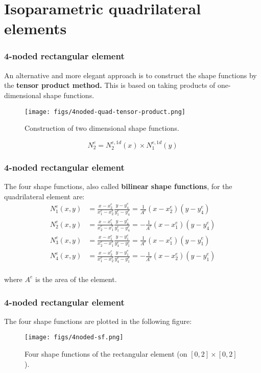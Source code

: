 \documentclass[notes]{beamer}
\begin{document}
\section{Isoparametric quadrilateral elements}

\begin{frame}
	\frametitle{4-noded rectangular element}
	An alternative and more elegant approach is to construct the shape functions by the \textbf{tensor
		product method.} This is based on taking products of one-dimensional shape functions.
	
	\begin{figure}[ht]
		\centering
		\texttt{[image: figs/4noded-quad-tensor-product.png]}
		\caption*{Construction of two dimensional shape functions.}
	\end{figure}
	\begin{equation*}
		N_2^e = N_2^{e,1d}(x) \times N_1^{e,1d}(y)
	\end{equation*}
	
\end{frame}

\begin{frame}
	\frametitle{4-noded rectangular element}
	
	The four shape functions, also called \textbf{bilinear shape functions}, for the quadrilateral element are:
	\begin{align*}
		N_1^e (x, y) & = \frac{x - x_2^e}{x_1^e - x_2^e}\frac{y - y_4^e}{y_1^e - y_4^e} = \frac{1}{A^e}(x - x_2^e)(y - y_4^e) \\
		N_2^e (x, y) & = \frac{x - x_1^e}{x_2^e - x_1^e}\frac{y - y_4^e}{y_1^e - y_4^e} = -\frac{1}{A^e}(x - x_1^e)(y - y_4^e) \\
		N_3^e (x, y) & = \frac{x - x_1^e}{x_2^e - x_1^e}\frac{y - y_1^e}{y_4^e - y_1^e} = \frac{1}{A^e}(x - x_1^e)(y - y_1^e) \\
		N_4^e (x, y) & = \frac{x - x_2^e}{x_1^e - x_2^e}\frac{y - y_1^e}{y_4^e - y_1^e} = -\frac{1}{A^e}(x - x_2^e)(y - y_1^e)\\
	\end{align*}
	
	where $A^e$ is the area of the element.
	
\end{frame}


\begin{frame}
	\frametitle{4-noded rectangular element}
	The four shape functions are plotted in the following
	figure:
	\begin{figure}[ht]
		\centering
		\texttt{[image: figs/4noded-sf.png]}
		\caption*{Four shape functions of the rectangular element (on $[0, 2] \times [0, 2]$).}
	\end{figure}
\end{frame}
\end{document}

